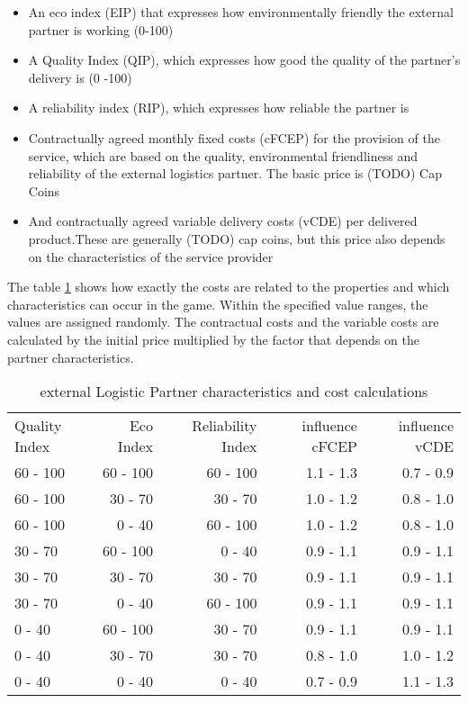 \begin{itemize}
    \item An eco index (EIP) that expresses how environmentally friendly the external partner is working (0-100)
    \item A Quality Index (QIP), which expresses how good the quality of the partner's delivery is (0 -100)
    \item A reliability index (RIP), which expresses how reliable the partner is
    \item Contractually agreed monthly fixed costs (cFCEP) for the provision of the service, which are based on the quality, environmental friendliness and reliability of the external logistics partner. The basic price is (TODO) Cap Coins 
    \item And contractually agreed variable delivery costs (vCDE) per delivered product.These are generally (TODO) cap coins, but this price also depends on the characteristics of the service provider
\end{itemize}

The table \ref{External_logistic_partner_characteristics} shows how exactly the costs are related to the properties and which characteristics can occur in the game. Within the specified value ranges, the values are assigned randomly. 
The contractual costs and the variable costs are calculated by the initial price multiplied by the factor that depends on the partner characteristics.

\begin{table}[ht]
    \centering
    \begin{tabular}{|l|r|r|r|r|}
    \hline
    Quality Index & Eco Index & Reliability Index & influence cFCEP & influence vCDE \\
    60 - 100      & 60 - 100   & 60 - 100  & 1.1 - 1.3    & 0.7 - 0.9     \\
    60 - 100      & 30 - 70    & 30 - 70   & 1.0 - 1.2    & 0.8 - 1.0     \\
    60 - 100      & 0 - 40     & 60 - 100  & 1.0 - 1.2    & 0.8 - 1.0     \\
    30 - 70       & 60 - 100   & 0 - 40    & 0.9 - 1.1    & 0.9 - 1.1     \\
    30 - 70       & 30 - 70    & 30 - 70   & 0.9 - 1.1    & 0.9 - 1.1     \\
    30 - 70       & 0 - 40     & 60 - 100  & 0.9 - 1.1    & 0.9 - 1.1     \\
    0 - 40        & 60 - 100   & 30 - 70   & 0.9 - 1.1    & 0.9 - 1.1     \\
    0 - 40        & 30 - 70    & 30 - 70   & 0.8 - 1.0    & 1.0 - 1.2     \\
    0 - 40        & 0 - 40     & 0 - 40    & 0.7 - 0.9    & 1.1 - 1.3     \\
    \hline
    \end{tabular}
    \caption{external Logistic Partner characteristics and cost calculations}
    \label{External_logistic_partner_characteristics}
\end{table}

